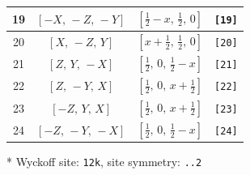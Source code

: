\documentclass[fleqn,8pt]{jsarticle}
\begin{document}
\begin{longtable}{cccc}
19 & $\left[ - X,\, - Z,\, - Y \right]$ & $\left[ \frac{1}{2} - x,\, \frac{1}{2},\, 0 \right]$ & {\tt [19]} \\ \hline
20 & $\left[ X,\, - Z,\, Y \right]$ & $\left[ x + \frac{1}{2},\, \frac{1}{2},\, 0 \right]$ & {\tt [20]} \\ \hline
21 & $\left[ Z,\, Y,\, - X \right]$ & $\left[ \frac{1}{2},\, 0,\, \frac{1}{2} - x \right]$ & {\tt [21]} \\ \hline
22 & $\left[ Z,\, - Y,\, X \right]$ & $\left[ \frac{1}{2},\, 0,\, x + \frac{1}{2} \right]$ & {\tt [22]} \\ \hline
23 & $\left[ - Z,\, Y,\, X \right]$ & $\left[ \frac{1}{2},\, 0,\, x + \frac{1}{2} \right]$ & {\tt [23]} \\ \hline
24 & $\left[ - Z,\, - Y,\, - X \right]$ & $\left[ \frac{1}{2},\, 0,\, \frac{1}{2} - x \right]$ & {\tt [24]} \\
\end{longtable}
* Wyckoff site: {\tt 12k}, site symmetry: {\tt ..2}
\renewcommand{\arraystretch}{1.2}
\end{document}
